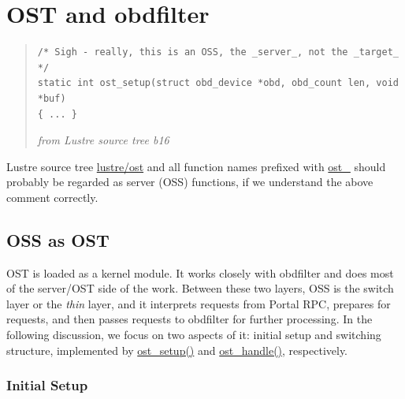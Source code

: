 \section{OST and obdfilter}
\label{sec:ost-and-obdfilter}

\begin{quote}
\begin{Verbatim}
/* Sigh - really, this is an OSS, the _server_, not the _target_ */
static int ost_setup(struct obd_device *obd, obd_count len, void *buf)
{ ... }
\end{Verbatim}
\begin{flushright}
\textit{\small from Lustre source tree b16}
\end{flushright}
\end{quote}

Lustre source tree \url{lustre/ost} and all function names prefixed with
\url{ost_} should probably be regarded as server (OSS) functions, if we
understand the above comment correctly.

\subsection{OSS as OST}

OST is loaded as a kernel module. It works closely with obdfilter and does most
of the server/OST side of the work. Between these two layers, OSS is the switch
layer or the \textit{thin} layer, and it interprets requests from Portal RPC,
prepares for requests, and then passes requests to obdfilter for further
processing. In the following discussion, we focus on two aspects of it: initial
setup and switching structure, implemented by \url{ost_setup()} and
\url{ost_handle()}, respectively.

\subsubsection*{Initial Setup}

